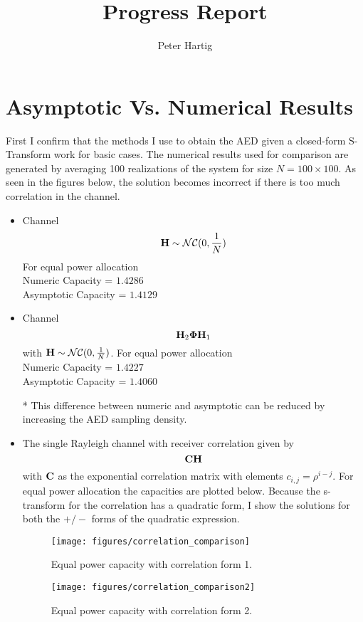 \documentclass[12pt,a4paper]{report}
\title{Progress Report}
\author{Peter Hartig}
\begin{document}
\maketitle
\tableofcontents

\section{Asymptotic Vs. Numerical Results}
First I confirm that the methods I use to obtain the AED given a closed-form S-Transform work for basic cases.
The numerical results  used for comparison are generated by averaging 100 realizations of the system for size $N=100 \times 100$.
As seen in the figures below, the solution becomes incorrect if there is too much correlation in the channel. 
\begin{itemize}
\item
	Channel 
	\begin{equation}
	\mathbf{H}  \sim \mathcal{NC}(0,\frac{1}{N})
	\end{equation}
	For equal power allocation 
	\\
	Numeric Capacity = $  1.4286$ 
	\\
	Asymptotic Capacity = $ 1.4129 $
	
\item
	Channel 
	\begin{equation}
	\mathbf{H}_2 \boldsymbol{\Phi} \mathbf{H}_1  
	\end{equation}
	with $\mathbf{H} \sim \mathcal{NC}(0,\frac{1}{N})$.
	For equal power allocation 
	\\
	Numeric Capacity = $ 1.4227$ 
	\\
	Asymptotic Capacity = $ 1.4060 $	
	
	* This difference between numeric and asymptotic  can be reduced by increasing the AED sampling density.
	
\item
	The single Rayleigh channel with receiver correlation given by 
	\begin{equation}
	\mathbf{C}\mathbf{H}  
	\end{equation}
	with $\mathbf{C}$ as the exponential correlation matrix  with elements $c_{i,j} = \rho^{i-j}$. 
	For equal power allocation the capacities are plotted below. Because the s-transform for the correlation has a quadratic form, I show the solutions for both the $+/-$ forms of the quadratic expression.
	
	\begin{figure}[H]
	\texttt{[image: figures/correlation\_comparison]}
	  \caption{Equal power capacity with correlation form 1.}
	\end{figure}
	\begin{figure}[H]
	\texttt{[image: figures/correlation\_comparison2]}
	  \caption{Equal power capacity with correlation form 2.}
\end{figure}


\end{itemize}
\end{document}
